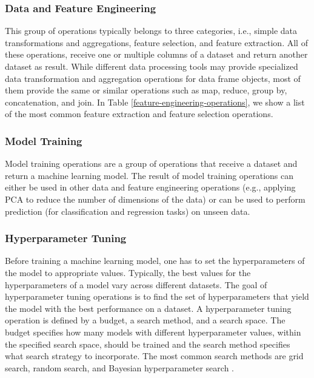 \subsubsection{Data and Feature Engineering}
This group of operations typically belongs to three categories, i.e., simple data transformations and aggregations, feature selection, and feature extraction.
All of these operations, receive one or multiple columns of a dataset and return another dataset as result. 
While different data processing tools may provide specialized data transformation and aggregation operations for data frame objects, most of them provide the same or similar operations such as map, reduce, group by, concatenation, and join. 
In Table \ref{feature-engineering-operations}, we show a list of the most common feature extraction and feature selection operations.

\subsubsection{Model Training}
Model training operations are a group of operations that receive a dataset and return a machine learning model.
The result of model training operations can either be used in other data and feature engineering operations (e.g., applying PCA to reduce the number of dimensions of the data) or can be used to perform prediction (for classification and regression tasks) on unseen data.

\subsubsection{Hyperparameter Tuning}
Before training a machine learning model, one has to set the hyperparameters of the model to appropriate values.
Typically, the best values for the hyperparameters of a model vary across different datasets.
The goal of hyperparameter tuning operations is to find the set of hyperparameters that yield the model with the best performance on a dataset.
A hyperparameter tuning operation is defined by a budget, a search method, and a search space.
The budget specifies how many models with different hyperparameter values, within the specified search space, should be trained and the search method specifies what search strategy to incorporate.
The most common search methods are grid search, random search, and Bayesian hyperparameter search \cite{bergstra2012random,snoek2012practical}.


